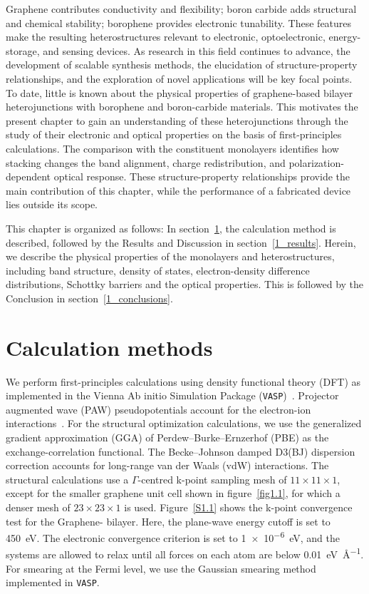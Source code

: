 Graphene contributes conductivity and flexibility; boron carbide adds structural and chemical stability; borophene provides electronic tunability.
These features make the resulting heterostructures relevant to electronic, optoelectronic, energy-storage, and sensing devices.
As research in this field continues to advance,
the development of scalable synthesis methods, the elucidation of structure-property relationships,
and the exploration of novel applications will be key focal points.
To date, little is known about the physical properties of graphene-based bilayer heterojunctions with borophene and boron-carbide materials.
This motivates the present chapter to gain an understanding of these heterojunctions
through the study of their electronic and optical properties on the basis of first-principles calculations.
The comparison with the constituent monolayers identifies how stacking changes the band alignment, charge redistribution, and polarization-dependent optical response.
These structure-property relationships provide the main contribution of this chapter,
while the performance of a fabricated device lies outside its scope.

This chapter is organized as follows:
In section~\ref{1_calculation_methods}, the calculation method is described,
followed by the Results and Discussion in section~\ref{1_results}.
Herein, we describe the physical properties of the monolayers and heterostructures, including band structure, density of states, electron-density difference distributions,
Schottky barriers and the optical properties.
This is followed by the Conclusion in section~\ref{1_conclusions}.

\FloatBarrier
\section{Calculation methods}
\label{1_calculation_methods}

We perform first-principles calculations using density functional theory (DFT) as implemented in the Vienna Ab initio Simulation Package (\texttt{VASP})~\cite{kresse1993ab, kresse1996efficiency, kresse1996efficient}.
Projector augmented wave (PAW) pseudopotentials account for the electron-ion interactions~\cite{kresse1999ultrasoft}.
For the structural optimization calculations, we use the generalized gradient approximation (GGA) of Perdew--Burke--Ernzerhof (PBE) as the exchange-correlation functional.
The Becke--Johnson damped D3(BJ) dispersion correction accounts for long-range van der Waals (vdW) interactions.
The structural calculations use a $\Gamma$-centred k-point sampling mesh of $11 \times 11 \times 1$, except for the smaller graphene unit cell shown in figure~\ref{fig1.1}, for which a denser mesh of $23 \times 23 \times 1$ is used.
Figure~\ref{S1.1} shows the k-point convergence test for the Graphene- bilayer.
Here, the plane-wave energy cutoff is set to \qty{450}{\electronvolt}.
The electronic convergence criterion is set to \qty{1e-6}{\electronvolt}, and the systems are allowed to relax until all forces on each atom are below \qty{0.01}{\electronvolt\per\angstrom}.
For smearing at the Fermi level,
we use the Gaussian smearing method implemented in \texttt{VASP}.

